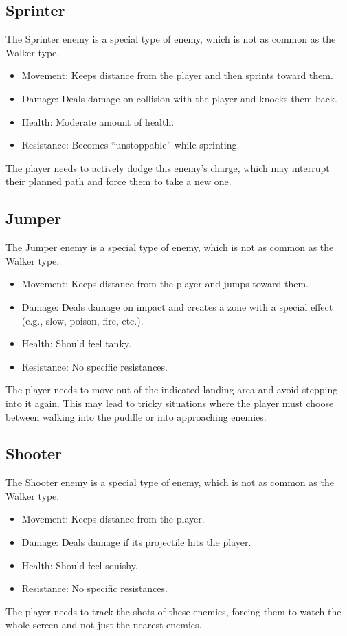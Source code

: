 \documentclass[12pt]{article}
\begin{document}
\subsection{Sprinter}
The Sprinter enemy is a special type of enemy, which is not as common as the Walker type.
\begin{itemize}
    \item Movement: Keeps distance from the player and then sprints toward them. 
    \item Damage: Deals damage on collision with the player and knocks them back. 
    \item Health: Moderate amount of health.
    \item Resistance: Becomes “unstoppable” while sprinting.
\end{itemize}
The player needs to actively dodge this enemy's charge, which may interrupt their planned path and force them to take a new one.

\subsection{Jumper}
The Jumper enemy is a special type of enemy, which is not as common as the Walker type.
\begin{itemize}
    \item Movement: Keeps distance from the player and jumps toward them. 
    \item Damage: Deals damage on impact and creates a zone with a special effect\\
    (e.g., slow, poison, fire, etc.).
    \item Health: Should feel tanky.
    \item Resistance: No specific resistances.
\end{itemize}
The player needs to move out of the indicated landing area and avoid stepping into it again. This may lead to tricky situations where the player must choose between walking into the puddle or into approaching enemies.

\subsection{Shooter}
The Shooter enemy is a special type of enemy, which is not as common as the Walker type.
\begin{itemize}
    \item Movement: Keeps distance from the player.  
    \item Damage: Deals damage if its projectile hits the player. 
    \item Health: Should feel squishy.
    \item Resistance: No specific resistances.
\end{itemize}
The player needs to track the shots of these enemies, forcing them to watch the whole screen and not just the nearest enemies.
\end{document}

